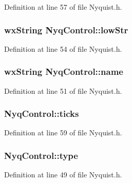 Definition at line 57 of file Nyquist.\+h.

\subsubsection[{\texorpdfstring{low\+Str}{lowStr}}]{\setlength{\rightskip}{0pt plus 5cm}wx\+String Nyq\+Control\+::low\+Str}\hypertarget{class_nyq_control_ae0b7dc3637e5d516c7879eb1825c33df}{}\label{class_nyq_control_ae0b7dc3637e5d516c7879eb1825c33df}


Definition at line 54 of file Nyquist.\+h.

\subsubsection[{\texorpdfstring{name}{name}}]{\setlength{\rightskip}{0pt plus 5cm}wx\+String Nyq\+Control\+::name}\hypertarget{class_nyq_control_a43945e9380376f91f123698b60630650}{}\label{class_nyq_control_a43945e9380376f91f123698b60630650}


Definition at line 51 of file Nyquist.\+h.

\subsubsection[{\texorpdfstring{ticks}{ticks}}]{ Nyq\+Control\+::ticks}\hypertarget{class_nyq_control_a7a2169aad60ff2858141b2a21a2f0061}{}\label{class_nyq_control_a7a2169aad60ff2858141b2a21a2f0061}


Definition at line 59 of file Nyquist.\+h.

\subsubsection[{\texorpdfstring{type}{type}}]{ Nyq\+Control\+::type}\hypertarget{class_nyq_control_aae478bdf7afdea770edc3581ebdb8090}{}\label{class_nyq_control_aae478bdf7afdea770edc3581ebdb8090}


Definition at line 49 of file Nyquist.\+h.

